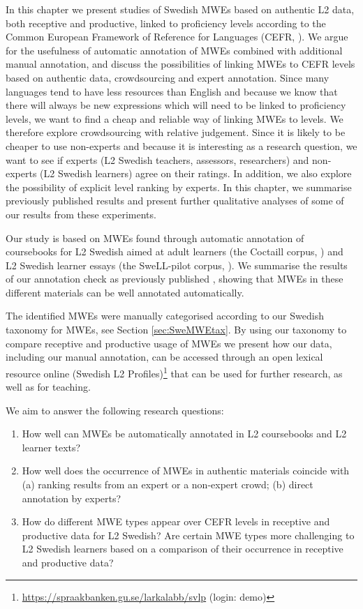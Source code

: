 \documentclass[output=paper,colorlinks,citecolor=brown]{langscibook}
\begin{document}
In this chapter we present studies of Swedish MWEs based on authentic L2 data, both receptive and productive, linked to proficiency levels according to the Common European Framework of Reference for Languages (CEFR, \cite{council2001common}). We argue for the usefulness of automatic annotation of MWEs combined with additional manual annotation, and discuss the possibilities of linking MWEs to CEFR levels based on authentic data, crowdsourcing and expert annotation. Since many languages tend to have less resources than English and because we know that there will always be new expressions which will need to be linked to proficiency levels, we want to find a cheap and reliable way of linking MWEs to levels. We therefore explore crowdsourcing with relative judgement. Since it is likely to be cheaper to use non-experts and because it is interesting as a research question, we want to see if experts (L2 Swedish teachers, assessors, researchers) and non-experts (L2 Swedish learners) agree on their ratings. In addition, we also explore the possibility of explicit level ranking by experts. In this chapter, we summarise previously published results \citep[see][]{alfter2021mwe,lindstrom2022MWE} and present further qualitative analyses of some of our results from these experiments. 

Our study is based on MWEs found through automatic annotation of coursebooks for L2 Swedish aimed at adult learners (the Coctaill corpus, \cite{volodina2014you}) and L2 Swedish learner essays (the SweLL-pilot corpus, \cite{volodina2016swell}). 
We summarise the results of our annotation check as previously published \citep[][]{volodina2022annotation}{}{}, showing that MWEs in these different materials can be well annotated automatically.

The identified MWEs were manually categorised according to our Swedish taxonomy for MWEs, see Section \ref{sec:SweMWEtax}. 
By using our taxonomy to compare receptive and productive usage of MWEs we  present how our data, including our manual annotation, can be accessed through an open lexical resource online (Swedish L2 Profiles)\footnote{\url{https://spraakbanken.gu.se/larkalabb/svlp} (login: demo)} that can be used for further research, as well as for teaching.  


We aim to answer the following research questions: 
\begin{enumerate}
\item How well can MWEs be automatically annotated in L2 coursebooks and L2 learner texts?
\item How well does the occurrence of MWEs in authentic materials coincide with (a) ranking results from an expert or a non-expert crowd; (b) direct annotation by experts?
\item How do different MWE types appear over CEFR levels in receptive and productive data for L2 Swedish? Are certain MWE types more challenging to L2 Swedish learners based on a comparison of their occurrence in receptive and productive data?
\end{enumerate}
\end{document}
